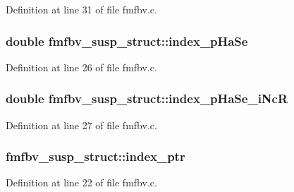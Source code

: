 Definition at line 31 of file fmfbv.\+c.

\subsubsection[{\texorpdfstring{index\+\_\+p\+Ha\+Se}{index_pHaSe}}]{\setlength{\rightskip}{0pt plus 5cm}double fmfbv\+\_\+susp\+\_\+struct\+::index\+\_\+p\+Ha\+Se}\hypertarget{structfmfbv__susp__struct_a6341b71fe95abe59c173b8a9cfc9fbff}{}\label{structfmfbv__susp__struct_a6341b71fe95abe59c173b8a9cfc9fbff}


Definition at line 26 of file fmfbv.\+c.

\subsubsection[{\texorpdfstring{index\+\_\+p\+Ha\+Se\+\_\+i\+NcR}{index_pHaSe_iNcR}}]{\setlength{\rightskip}{0pt plus 5cm}double fmfbv\+\_\+susp\+\_\+struct\+::index\+\_\+p\+Ha\+Se\+\_\+i\+NcR}\hypertarget{structfmfbv__susp__struct_ad582617ee96483604820d22f6d31bde6}{}\label{structfmfbv__susp__struct_ad582617ee96483604820d22f6d31bde6}


Definition at line 27 of file fmfbv.\+c.

\subsubsection[{\texorpdfstring{index\+\_\+ptr}{index_ptr}}]{ fmfbv\+\_\+susp\+\_\+struct\+::index\+\_\+ptr}\hypertarget{structfmfbv__susp__struct_aaf70f690bcbd68cfc7a2a03ea508c969}{}\label{structfmfbv__susp__struct_aaf70f690bcbd68cfc7a2a03ea508c969}


Definition at line 22 of file fmfbv.\+c.

